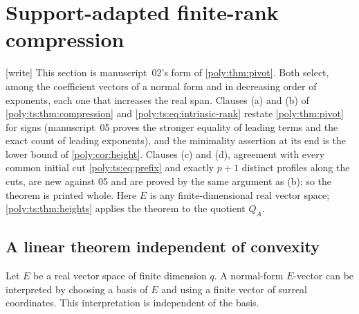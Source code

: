 \documentclass[11pt,a4paper]{article}
\numberwithin{equation}{section}
\theoremstyle{plain}
\newcommand{\wtag}{\textup{[write]}}%
\begin{document}
\section{Support-adapted finite-rank compression}\label{poly:ts:sec:compression}
\noindent\wtag{} This section is manuscript~02's form of
\cref{poly:thm:pivot}. Both select, among the coefficient vectors of a
normal form and in decreasing order of exponents, each one that increases
the real span. Clauses (a) and (b) of \cref{poly:ts:thm:compression} and
\eqref{poly:ts:eq:intrinsic-rank} restate \cref{poly:thm:pivot} for signs
(manuscript~05 proves the stronger equality of leading terms and the exact
count of leading exponents), and the minimality assertion at its end is the
lower bound of \cref{poly:cor:height}. Clauses (c) and (d), agreement with
every common initial cut \eqref{poly:ts:eq:prefix} and exactly $p+1$
distinct profiles along the cuts, are new against 05 and are proved by the
same argument as (b); so the theorem is printed whole. Here $E$ is any
finite-dimensional real vector space; \cref{poly:ts:thm:heights} applies the
theorem to the quotient $Q_A$.

\subsection{A linear theorem independent of convexity}
Let $E$ be a real vector space of finite dimension $q$. A normal-form
$E$-vector can be interpreted by choosing a basis of $E$ and using a finite
vector of surreal coordinates. This interpretation is independent of the
basis.
\end{document}
